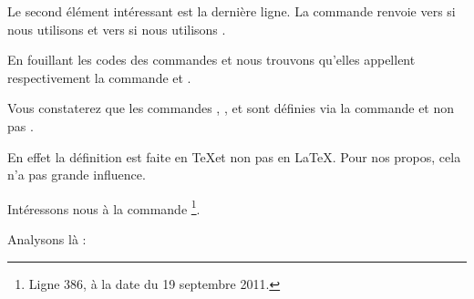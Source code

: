 Le second élément intéressant est la dernière ligne. La commande  renvoie vers  si nous utilisons  et vers  si nous utilisons .

En fouillant les codes des commandes  et  nous trouvons qu'elles appellent respectivement la commande  et .

\begin{plusloins}
Vous constaterez que les commandes , ,  et  sont définies via la commande  et non pas . 

En effet la définition est faite en \TeX et non pas en \LaTeX. Pour nos propos, cela n'a pas grande influence.
\end{plusloins} 

Intéressons nous à la commande \footnote{Ligne 386, à la date du 19 septembre 2011.}.

\begin{latexcode}
\def\@makechapterhead#1{%
  \vspace*{50\p@}%
  {\parindent \z@ \raggedright \normalfont
    \ifnum \c@secnumdepth >\m@ne
      \if@mainmatter
        \huge\bfseries \@chapapp\space \thechapter
        \par\nobreak
        \vskip 20\p@
      \fi
    \fi
    \interlinepenalty\@M
    \Huge \bfseries #1\par\nobreak
    \vskip 40\p@
  }}
\end{latexcode}

Analysons là :

